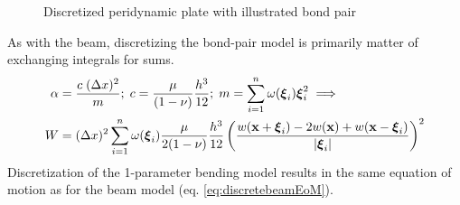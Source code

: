 %
\begin{figure}[h]
  \centering
{}
\caption{Discretized peridynamic plate with illustrated bond pair}
\label{fig:discretePlate}
\end{figure}
%
As with the beam, discretizing the bond-pair model is primarily matter of exchanging integrals for sums. 
%
%
\begin{align}
\label{eq:discreteplate}
    \alpha &= \frac{c\; (\Delta x)^2}{m} ;\; c= \frac{\mu}{(1-\nu)}\frac{h^3}{12};\; m=\sum_{i=1}^n \omega(\boldsymbol{\xi}_i)\boldsymbol{\xi}_i^2 \implies  \\
    W&=(\Delta x)^2 \sum_{i=1}^n \omega(\boldsymbol{\xi}_i)\frac{\mu}{2(1-\nu)}\frac{h^3}{12}\left(\frac{w(\mathbf{x}+\boldsymbol{\xi}_i)-2w(\mathbf{x})+w(\mathbf{x}-\boldsymbol{\xi}_i)}{|\boldsymbol{\xi}_i|}\right)^2 \notag
\end{align}
%
Discretization of the 1-parameter bending model results in the same equation of motion as for the beam model (eq. \ref{eq:discretebeamEoM}).
%
%

